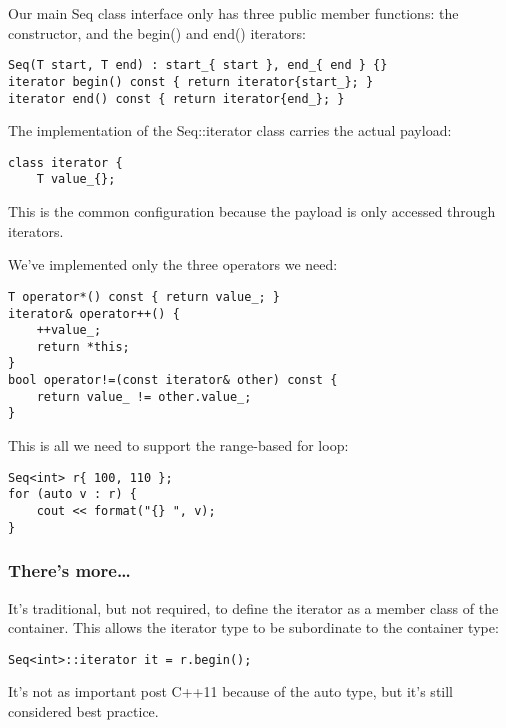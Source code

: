 Our main Seq class interface only has three public member functions: the constructor, and the begin() and end() iterators:

\begin{lstlisting}[style=styleCXX]
Seq(T start, T end) : start_{ start }, end_{ end } {}
iterator begin() const { return iterator{start_}; }
iterator end() const { return iterator{end_}; }
\end{lstlisting}

The implementation of the Seq::iterator class carries the actual payload:

\begin{lstlisting}[style=styleCXX]
class iterator {
	T value_{};
\end{lstlisting}

This is the common configuration because the payload is only accessed through iterators.

We've implemented only the three operators we need:

\begin{lstlisting}[style=styleCXX]
T operator*() const { return value_; }
iterator& operator++() {
	++value_;
	return *this;
}
bool operator!=(const iterator& other) const {
	return value_ != other.value_;
}
\end{lstlisting}

This is all we need to support the range-based for loop:

\begin{lstlisting}[style=styleCXX]
Seq<int> r{ 100, 110 };
for (auto v : r) {
	cout << format("{} ", v);
}
\end{lstlisting}

\subsubsection{There's more…}

It's traditional, but not required, to define the iterator as a member class of the container.
This allows the iterator type to be subordinate to the container type:

\begin{lstlisting}[style=styleCXX]
Seq<int>::iterator it = r.begin();
\end{lstlisting}

It's not as important post C++11 because of the auto type, but it's still considered best practice.





